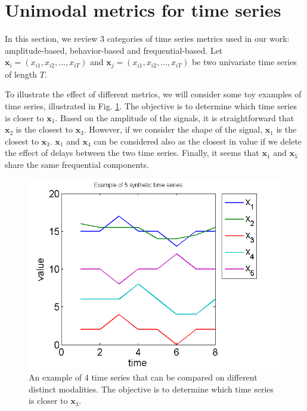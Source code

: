 \section{Unimodal metrics for time series}
In this section, we review 3 categories of time series metrics used in our work: amplitude-based, behavior-based and frequential-based. Let $\textbf{x}_i=(x_{i1}, x_{i2}, ..., x_{iT})$ and $\textbf{x}_j=(x_{i1}, x_{i2}, ..., x_{iT})$ be two univariate time series of length $T$. 

To illustrate the effect of different metrics, we will consider some toy examples of time series, illustrated in Fig. \ref{fig:ExampleTimeSeriesMetrics}. The objective is to determine which time series is closer to $\textbf{x}_1$. Based on the amplitude of the signals, it is straightforward that $\textbf{x}_2$ is the closest to $\textbf{x}_3$. However, if we consider the shape of the signal, $\textbf{x}_1$ is the closest to $\textbf{x}_3$. $\textbf{x}_1$ and $\textbf{x}_4$ can be considered also as the closest in value if we delete the effect of delays between the two time series. Finally, it seems that $\textbf{x}_1$ and $\textbf{x}_5$ share the same frequential components.

\begin{figure}[h!]
\centering
\includegraphics[width=0.6\linewidth]{images/ExampleTimeSeriesMetrics2}
\caption{An example of 4 time series that can be compared on different distinct modalities. The objective is to determine which time series is closer to $\textbf{x}_3$.}
\label{fig:ExampleTimeSeriesMetrics}
\end{figure}




